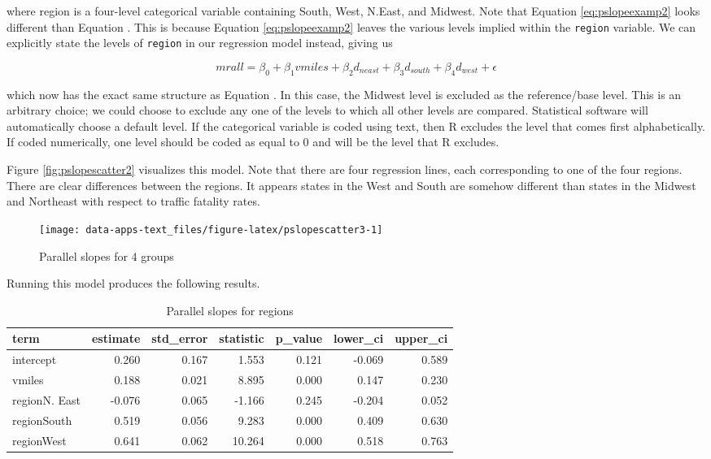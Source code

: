 \documentclass[
]{book}
\begin{document}
where region is a four-level categorical variable containing South, West, N.East, and Midwest. Note that Equation \eqref{eq:pslopeexamp2} looks different than Equation \label{eq:pslopemultd}. This is because Equation \eqref{eq:pslopeexamp2} leaves the various levels implied within the \texttt{region} variable. We can explicitly state the levels of \texttt{region} in our regression model instead, giving us

\begin{equation}
mrall = \beta_0 + \beta_1vmiles + \beta_2d_{neast} + \beta_3d_{south} + \beta_4d_{west} + \epsilon
\label{eq:pslopeexamp3}
\end{equation}

which now has the exact same structure as Equation \label{eq:pslopemultd}. In this case, the Midwest level is excluded as the reference/base level. This is an arbitrary choice; we could choose to exclude any one of the levels to which all other levels are compared. Statistical software will automatically choose a default level. If the categorical variable is coded using text, then R excludes the level that comes first alphabetically. If coded numerically, one level should be coded as equal to 0 and will be the level that R excludes.

Figure \ref{fig:pslopescatter2} visualizes this model. Note that there are four regression lines, each corresponding to one of the four regions. There are clear differences between the regions. It appears states in the West and South are somehow different than states in the Midwest and Northeast with respect to traffic fatality rates.

\begin{figure}

{\centering \texttt{[image: data-apps-text\_files/figure-latex/pslopescatter3-1]} 

}

\caption{Parallel slopes for 4 groups}\label{fig:pslopescatter3}
\end{figure}

Running this model produces the following results.

\begin{table}

\caption{\label{tab:psloperesults2}Parallel slopes for regions}
\centering
\begin{tabular}[t]{l|r|r|r|r|r|r}
\hline
term & estimate & std\_error & statistic & p\_value & lower\_ci & upper\_ci\\
\hline
intercept & 0.260 & 0.167 & 1.553 & 0.121 & -0.069 & 0.589\\
\hline
vmiles & 0.188 & 0.021 & 8.895 & 0.000 & 0.147 & 0.230\\
\hline
regionN. East & -0.076 & 0.065 & -1.166 & 0.245 & -0.204 & 0.052\\
\hline
regionSouth & 0.519 & 0.056 & 9.283 & 0.000 & 0.409 & 0.630\\
\hline
regionWest & 0.641 & 0.062 & 10.264 & 0.000 & 0.518 & 0.763\\
\hline
\end{tabular}
\end{table}
\end{document}
